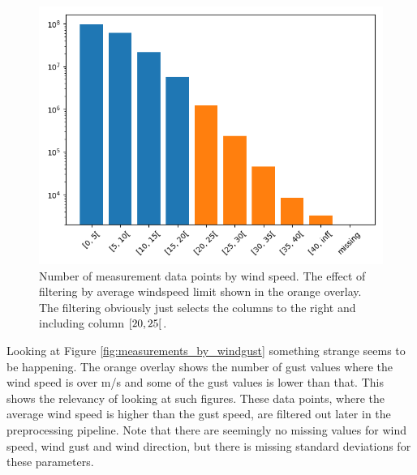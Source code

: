 \begin{figure}
    \centering
    \includegraphics[scale = 0.75]{Figures/measurements_by_windspeed.png}
    \caption[Number of measurement data points by wind speed.]{Number of measurement data points by wind speed. The effect of filtering by average windspeed limit shown in the orange overlay. The filtering obviously just selects the columns to the right and including column $\protect [20, 25[$.}
    \label{fig:measurements_by_windspeed}
\end{figure}

Looking at Figure \ref{fig:measurements_by_windgust} something strange seems to be happening. The orange overlay shows the number of gust values where the wind speed is over \averageWindSpeedLimit m/s and some of the gust values is lower than that. This shows the relevancy of looking at such figures. These data points, where the average wind speed is higher than the gust speed, are filtered out later in the preprocessing pipeline. Note that there are seemingly no missing values for wind speed, wind gust and wind direction, but there is missing standard deviations for these parameters.

